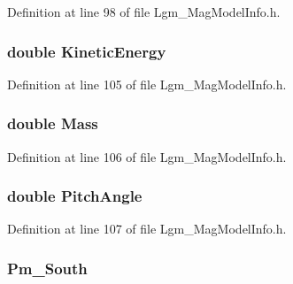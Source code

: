 Definition at line 98 of file Lgm\_\-MagModelInfo.h.\hypertarget{struct_lgm___mag_model_info_869c8a1c2af0f48c6e871b08c13d2852}{
\subsubsection[{KineticEnergy}]{\setlength{\rightskip}{0pt plus 5cm}double {\bf KineticEnergy}}}
\label{struct_lgm___mag_model_info_869c8a1c2af0f48c6e871b08c13d2852}




Definition at line 105 of file Lgm\_\-MagModelInfo.h.\hypertarget{struct_lgm___mag_model_info_c33418187547ea28dda7063924f34df6}{
\subsubsection[{Mass}]{\setlength{\rightskip}{0pt plus 5cm}double {\bf Mass}}}
\label{struct_lgm___mag_model_info_c33418187547ea28dda7063924f34df6}




Definition at line 106 of file Lgm\_\-MagModelInfo.h.\hypertarget{struct_lgm___mag_model_info_86da8321817d74036d3ff23e8643dc68}{
\subsubsection[{PitchAngle}]{\setlength{\rightskip}{0pt plus 5cm}double {\bf PitchAngle}}}
\label{struct_lgm___mag_model_info_86da8321817d74036d3ff23e8643dc68}




Definition at line 107 of file Lgm\_\-MagModelInfo.h.\hypertarget{struct_lgm___mag_model_info_a6b4371f4272ea673b10df3806973a78}{
\subsubsection[{Pm\_\-South}]{ {\bf Pm\_\-South}}}
\label{struct_lgm___mag_model_info_a6b4371f4272ea673b10df3806973a78}




